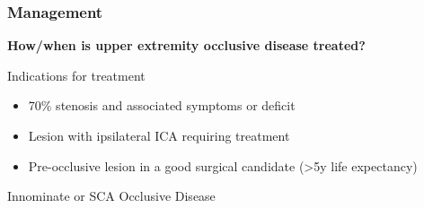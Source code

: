 \documentclass[
]{book}
\begin{document}
\hypertarget{management-1}{%
\subsubsection{Management}\label{management-1}}

\textbf{How/when is upper extremity occlusive disease treated?}

Indications for treatment

\begin{itemize}
\item
  70\% stenosis and associated symptoms or deficit
\item
  Lesion with ipsilateral ICA requiring treatment
\item
  Pre-occlusive lesion in a good surgical candidate (\textgreater5y life
  expectancy)
\end{itemize}

Innominate or SCA Occlusive Disease
\end{document}
